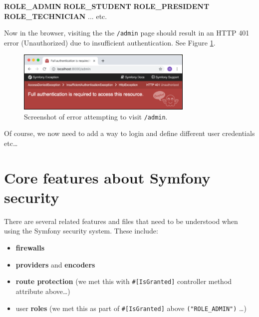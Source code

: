 \documentclass[a4paperpaper,openright]{book}
\newenvironment{Shaded}{}{}
\newcommand{\KeywordTok}[1]{\textcolor[rgb]{0.00,0.44,0.13}{\textbf{#1}}}
\newcommand{\NormalTok}[1]{#1}
\newcommand{\StringTok}[1]{\textcolor[rgb]{0.25,0.44,0.63}{#1}}
\providecommand{\tightlist}{%
  \setlength{\itemsep}{0pt}\setlength{\parskip}{0pt}}
\begin{document}
\begin{Shaded}
\begin{Highlighting}[]
    \KeywordTok{ROLE_ADMIN}
    \KeywordTok{ROLE_STUDENT}
    \KeywordTok{ROLE_PRESIDENT}
    \KeywordTok{ROLE_TECHNICIAN}
    \StringTok{...}\NormalTok{ etc. }
\end{Highlighting}
\end{Shaded}

Now in the browser, visiting the the \texttt{/admin} page should result
in an HTTP 401 error (Unauthorized) due to insufficient authentication.
See Figure \ref{not_authorised}.

\begin{figure}
\centering
\includegraphics[width=0.75\textwidth,height=\textheight]{./tex2pdf.-40a8cafc9587c9a0/1f857b19819be887adb09dafdce063deff3936e3.png}
\caption{Screenshot of error attempting to visit \texttt{/admin}.
\label{not_authorised}}
\end{figure}

Of course, we now need to add a way to login and define different user
credentials etc\ldots{}

\hypertarget{core-features-about-symfony-security}{%
\section{Core features about Symfony
security}\label{core-features-about-symfony-security}}

There are several related features and files that need to be understood
when using the Symfony security system. These include:

\begin{itemize}
\tightlist
\item
  \textbf{firewalls}
\item
  \textbf{providers} and \textbf{encoders}
\item
  \textbf{route protection} (we met this with \texttt{\#{[}IsGranted{]}}
  controller method attribute above\ldots{})
\item
  user \textbf{roles} (we met this as part of \texttt{\#{[}IsGranted{]}}
  above \texttt{("ROLE\_ADMIN")} \ldots{})
\end{itemize}
\end{document}
